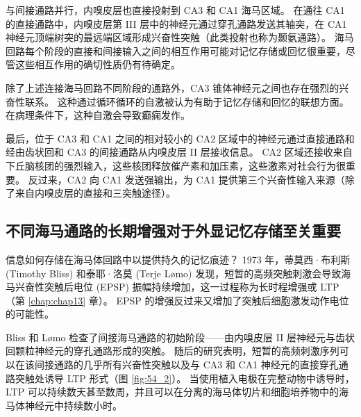与间接通路并行，内嗅皮层也直接投射到 CA3 和 CA1 海马区域。
在通往 CA1 的直接通路中，内嗅皮层第 III 层中的神经元通过穿孔通路发送其轴突，在 CA1 神经元顶端树突的最远端区域形成兴奋性突触（此类投射也称为颞氨通路）。
海马回路每个阶段的直接和间接输入之间的相互作用可能对记忆存储或回忆很重要，尽管这些相互作用的确切性质仍有待确定。


除了上述连接海马回路不同阶段的通路外，CA3 锥体神经元之间也存在强烈的兴奋性联系。
这种通过循环循环的自激被认为有助于记忆存储和回忆的联想方面。
在病理条件下，这种自激会导致癫痫发作。


最后，位于 CA3 和 CA1 之间的相对较小的 CA2 区域中的神经元通过直接通路和经由齿状回和 CA3 的间接通路从内嗅皮层 II 层接收信息。
CA2 区域还接收来自下丘脑核团的强烈输入，这些核团释放催产素和加压素，这些激素对社会行为很重要。 反过来，CA2 向 CA1 发送强输出，为 CA1 提供第三个兴奋性输入来源（除了来自内嗅皮层的直接和三突触途径）。



\subsection{不同海马通路的长期增强对于外显记忆存储至关重要}

信息如何存储在海马体回路中以提供持久的记忆痕迹？
1973 年，蒂莫西·布利斯 (Timothy Bliss) 和泰耶·洛莫 (Terje Lømo) 发现，短暂的高频突触刺激会导致海马兴奋性突触后电位 (EPSP) 振幅持续增加，这一过程称为长时程增强或 LTP（第 \ref{chap:chap13} 章）。
EPSP 的增强反过来又增加了突触后细胞激发动作电位的可能性。


Bliss 和 Lømo 检查了间接海马通路的初始阶段——由内嗅皮层 II 层神经元与齿状回颗粒神经元的穿孔通路形成的突触。
随后的研究表明，短暂的高频刺激序列可以在该间接通路的几乎所有兴奋性突触以及与 CA3 和 CA1 神经元的直接穿孔通路突触处诱导 LTP 形式（图 \ref{fig:54_2}）。
当使用植入电极在完整动物中诱导时，LTP 可以持续数天甚至数周，并且可以在分离的海马体切片和细胞培养物中的海马体神经元中持续数小时。


